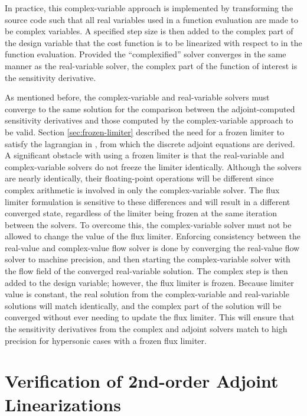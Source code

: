 In practice, this complex-variable approach is implemented by transforming the
source code such that all real variables used in a function evaluation are made
to be complex variables.  A specified step size is then added to the complex
part of the design variable that the cost function is to be linearized with
respect to in the function evaluation.  Provided the ``complexified'' solver
converges in the same manner as the real-variable solver, the complex part of
the function of interest is the sensitivity derivative.

As mentioned before, the complex-variable and real-variable solvers must
converge to the same solution for the comparison between the adjoint-computed
sensitivity derivatives and those computed by the complex-variable approach to
be valid.  Section \ref{sec:frozen-limiter} described the need for a frozen
limiter to satisfy the lagrangian in , from which the discrete
adjoint equations are derived.  A significant obstacle with using a frozen
limiter is that the real-variable and complex-variable solvers do not freeze the
limiter identically.  Although the solvers are nearly identically, their
floating-point operations will be different since complex arithmetic is involved
in only the complex-variable solver.  The flux limiter formulation is sensitive
to these differences and will result in a different converged state, regardless
of the limiter being frozen at the same iteration between the solvers.  To
overcome this, the complex-variable solver must not be allowed to change the
value of the flux limiter.  Enforcing consistency between the real-value and
complex-value flow solver is done by converging the real-value flow solver to
machine precision, and then starting the complex-variable solver with the flow
field of the converged real-variable solution.  The complex step is then added
to the design variable; however, the flux limiter is frozen.  Because limiter
value is constant, the real solution from the complex-variable and real-variable
solutions will match identically, and the complex part of the solution will be
converged without ever needing to update the flux limiter.  This will ensure
that the sensitivity derivatives from the complex and adjoint solvers match to
high precision for hypersonic cases with a frozen flux limiter.

\section{Verification of 2nd-order Adjoint Linearizations}

